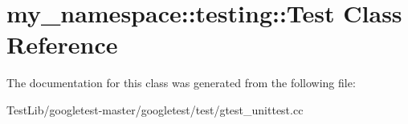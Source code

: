 \hypertarget{classmy__namespace_1_1testing_1_1Test}{}\section{my\+\_\+namespace\+:\+:testing\+:\+:Test Class Reference}
\label{classmy__namespace_1_1testing_1_1Test}


The documentation for this class was generated from the following file\+:\begin{DoxyCompactItemize}
\item 
Test\+Lib/googletest-\/master/googletest/test/gtest\+\_\+unittest.\+cc\end{DoxyCompactItemize}
